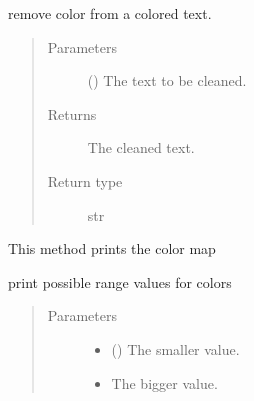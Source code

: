 \documentclass[a4paper,10pt,english]{sphinxmanual}
\begin{document}
\begin{fulllineitems}
\label{\detokenize{commands/apidoc/src:src.printcolors.cleancolor}}
remove color from a colored text.
\begin{quote}\begin{description}
\item[{Parameters}] \leavevmode
{} () \textendash{} The text to be cleaned.

\item[{Returns}] \leavevmode
The cleaned text.

\item[{Return type}] \leavevmode
str

\end{description}\end{quote}

\end{fulllineitems}


\begin{fulllineitems}
\label{\detokenize{commands/apidoc/src:src.printcolors.print_color_map}}
This method prints the color map

\end{fulllineitems}


\begin{fulllineitems}
\label{\detokenize{commands/apidoc/src:src.printcolors.print_color_range}}
print possible range values for colors
\begin{quote}\begin{description}
\item[{Parameters}] \leavevmode\begin{itemize}
\item {} 
 () \textendash{} The smaller value.

\item {} 
 \textendash{} The bigger value.

\end{itemize}

\end{description}\end{quote}

\end{fulllineitems}
\end{document}
